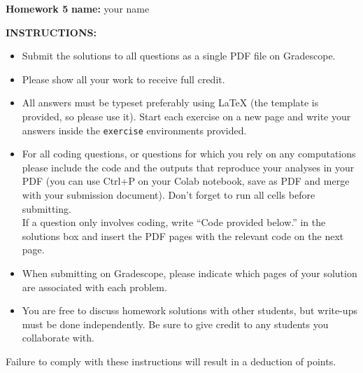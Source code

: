 \documentclass[11pt,notitlepage]{article}
\newcommand{\MBlue}[1]{{\color{MBlue}#1}}
\begin{document}
	\begin{center}
		\huge{\MBlue{\textbf{Homework 5}}}		
		\vskip20pt
		\Large{
			\textbf{name:} your name
        }
	\end{center}
    
    \begin{tcolorbox}[colframe=black, colback=white, boxrule=0.5mm, arc=2mm, left=3mm, right=3mm, top=3mm, bottom=3mm]
        \textbf{\color{red} INSTRUCTIONS:}
        \begin{itemize}
            \item Submit the solutions to all questions as a single PDF file on Gradescope.
            \vspace{-1mm}
            \item Please show all your work to receive full credit.
            \vspace{-1mm}
            \item All answers must be typeset preferably using LaTeX (the template is provided, so please use it). Start each exercise on a new page and write your answers inside the \texttt{exercise} environments provided.%
            \vspace{-1mm}
            \item For all coding questions, or questions for which you rely on any computations please include the code and the outputs that reproduce your analyses in your PDF (you can use Ctrl+P on your Colab notebook, save as PDF and merge with your submission document). Don't forget to run all cells before submitting. \\
            If a question only involves coding, write ``Code provided below.'' in the solutions box and insert the PDF pages with the relevant code on the next page.
            \vspace{-1mm}
            \item When submitting on Gradescope, please indicate which pages of your solution are associated with each problem.
            \vspace{-1mm}
            \item You are free to discuss homework solutions with other students, but write-ups must be done independently. Be sure to give credit to any students you collaborate with. 
        \end{itemize}
        Failure to comply with these instructions will result in a deduction of points.
    \end{tcolorbox}
        
\end{document}
